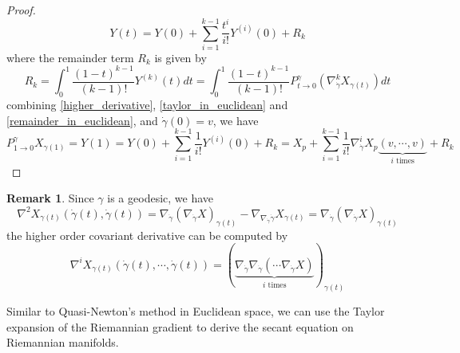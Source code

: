 \documentclass[12pt,a4paper,draft]{article}  %
\theoremstyle{definition}
\newtheorem{remark}{Remark}[section]
\numberwithin{equation}{section}
\begin{document}
\begin{proof}
\begin{equation}
        Y(t) = Y(0) + \sum_{i=1}^{k-1} \frac{t^i}{i!} Y^{(i)}(0) + R_k
        \end{equation}
        where the remainder term $R_k$ is given by
        \begin{equation}\label{remainder_in_euclidean}
                R_k = \int_0^1 \frac{(1-t)^{k-1}}{(k-1)!} Y^{(k)}(t) dt = \int_0^1 \frac{(1-t)^{k-1}}{(k-1)!} P_{t\to0}^\gamma \left(\nabla^k_{\dot{\gamma}} X_{\gamma(t)}\right) dt
        \end{equation}
        combining \eqref{higher_derivative}, \eqref{taylor_in_euclidean} and \eqref{remainder_in_euclidean}, and $\dot{\gamma}(0) = v$, we have
        \[
        P_{1\to0}^\gamma X_{\gamma(1)} = Y(1) = Y(0) + \sum_{i=1}^{k-1} \frac{1}{i!} Y^{(i)}(0) + R_k = X_p + \sum_{i=1}^{k-1}\frac{1}{i!} \nabla^i_{\dot{\gamma}} X_p\underbrace{(v,\cdots,v)}_{i\text{ times}} + R_k
        \]
\end{proof}
\begin{remark}
        Since $\gamma$ is a geodesic, we have
        \[
        \nabla^2 X_{\gamma(t)}(\dot{\gamma}(t),\dot{\gamma}(t)) = \nabla_{\dot{\gamma}} \left(\nabla_{\dot{\gamma}} X\right)_{\gamma(t)} - \nabla_{\nabla_{\dot{\gamma}} \dot{\gamma}} X_{\gamma(t)} = \nabla_{\dot{\gamma}} \left(\nabla_{\dot{\gamma}} X\right)_{\gamma(t)}
        \]
        the higher order covariant derivative can be computed by
        \[
\nabla^i X_{\gamma(t)}(\dot{\gamma}(t),\cdots,\dot{\gamma}(t)) = \left(\underbrace{\nabla_{\dot{\gamma}} \nabla_{\dot{\gamma}}\left(\cdots \nabla_{\dot{\gamma}} X\right)}_{i\text{ times}}\right)_{\gamma(t)}
        \]
\end{remark}
Similar to Quasi-Newton's method in Euclidean space, we can use the Taylor expansion of the Riemannian gradient to derive the secant equation on Riemannian manifolds. 
\end{document}
